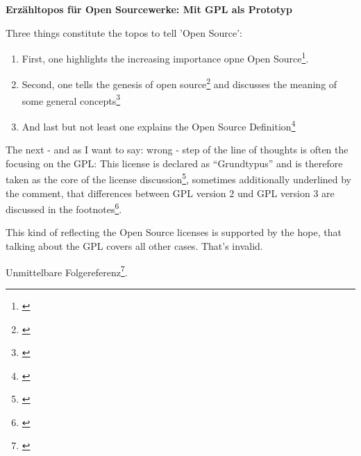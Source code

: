 %
%
%
%

%



\textbf{Erzähltopos für Open Sourcewerke: Mit GPL als Prototyp}

Three things constitute the topos to tell 'Open Source':
\begin{enumerate}
  \item First,  one highlights the increasing importance opne Open
  Source\footnote{\cite[cf.][1ff]{Oberhem2008a}}.
  \item Second, one tells the genesis of open
  source\footnote{\cite[cf.][9]{Oberhem2008a}} and discusses the meaning of some
  general concepts\footnote{\cite[cf.][6ff and 17ff]{Oberhem2008a}}
  \item And last but not least one explains the Open Source
  Definition\footnote{\cite[cf.][10ff]{Oberhem2008a}}
\end{enumerate}

The next - and as I want to say: wrong - step of the line of thoughts is often
the focusing on the GPL: This license is declared as \enquote{Grundtypus}
and is therefore taken as the core of the license
discussion\footnote{\cite[cf.][33]{Oberhem2008a}}, sometimes additionally
underlined by the comment, that differences between GPL version 2 und GPL
version 3 are discussed in the footnotes\footnote{\cite[cf.][34]{Oberhem2008a}}.

This kind of reflecting the Open Source licenses is supported by the hope, that
talking about the GPL covers all other cases. That's invalid.

Unmittelbare Folgereferenz\footnote{\cite[cf.][S.2]{Oberhem2008a}}.


%

